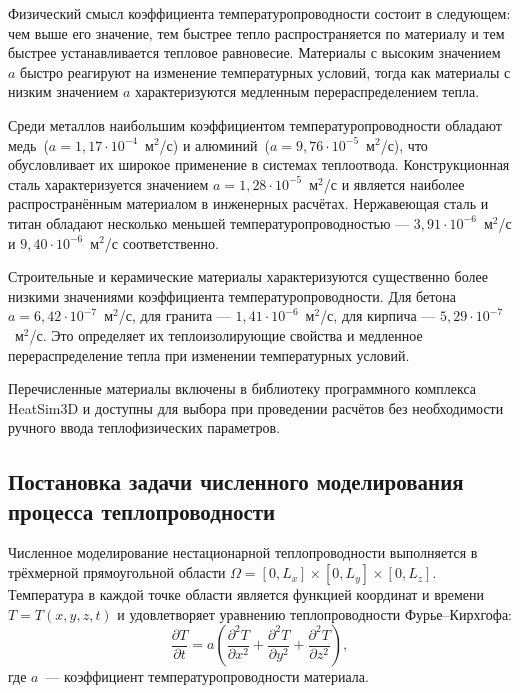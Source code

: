 Физический смысл коэффициента температуропроводности состоит в следующем: 
чем выше его значение, тем быстрее тепло распространяется по материалу 
и тем быстрее устанавливается тепловое равновесие. Материалы с высоким 
значением $a$ быстро реагируют на изменение температурных условий, тогда 
как материалы с низким значением $a$ характеризуются медленным 
перераспределением тепла.

Среди металлов наибольшим коэффициентом температуропроводности обладают 
медь~($a = 1{,}17 \cdot 10^{-4}$~м$^2$/с) и алюминий~($a = 9{,}76 \cdot 
10^{-5}$~м$^2$/с), что обусловливает их широкое применение в системах 
теплоотвода. Конструкционная сталь характеризуется значением $a = 1{,}28 
\cdot 10^{-5}$~м$^2$/с и является наиболее распространённым материалом в 
инженерных расчётах. Нержавеющая сталь и титан обладают несколько меньшей 
температуропроводностью --- $3{,}91 \cdot 10^{-6}$~м$^2$/с и $9{,}40 \cdot 
10^{-6}$~м$^2$/с соответственно.

Строительные и керамические материалы характеризуются существенно более 
низкими значениями коэффициента температуропроводности. Для бетона 
$a = 6{,}42 \cdot 10^{-7}$~м$^2$/с, для гранита --- $1{,}41 \cdot 
10^{-6}$~м$^2$/с, для кирпича --- $5{,}29 \cdot 10^{-7}$~м$^2$/с. 
Это определяет их теплоизолирующие свойства и медленное перераспределение 
тепла при изменении температурных условий.

Перечисленные материалы включены в библиотеку программного комплекса 
HeatSim3D и доступны для выбора при проведении расчётов без необходимости 
ручного ввода теплофизических параметров.

\subsection{Постановка задачи численного моделирования процесса теплопроводности}

Численное моделирование нестационарной теплопроводности выполняется 
в трёхмерной прямоугольной области $\Omega = [0, L_x] \times [0, L_y] 
\times [0, L_z]$. Температура в каждой точке области является функцией 
координат и времени $T = T(x, y, z, t)$ и удовлетворяет уравнению 
теплопроводности Фурье--Кирхгофа:
\begin{equation}
    \frac{\partial T}{\partial t} = a \left( 
    \frac{\partial^2 T}{\partial x^2} + 
    \frac{\partial^2 T}{\partial y^2} + 
    \frac{\partial^2 T}{\partial z^2} \right),
\end{equation}
где $a$~--- коэффициент температуропроводности материала.

